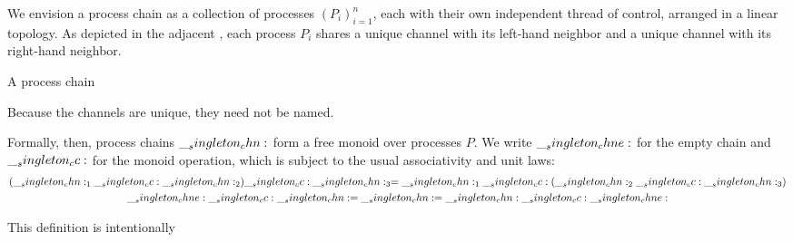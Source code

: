 We envision a process chain as a collection of processes $(P_i)_{i=1}^{n}$, each with their own independent thread of control, arranged in a linear topology.
As depicted in the adjacent , each process $P_i$ shares a unique channel with its left-hand neighbor and a unique channel with its right-hand neighbor.
%
\begin{marginfigure}
  \caption{A process chain}\label{fig:singleton-processes:chain-topology}
\end{marginfigure}
%
Because the channels are unique, they need not be named.

Formally, then, process chains $\__singleton_chn:$ form a free monoid over processes $P$.
We write $\__singleton_chne:$ for the empty chain and $\__singleton_cc:$ for the monoid operation, which is subject to the usual associativity and unit laws:
\begin{gather*}
  (\__singleton_chn:_1 \__singleton_cc: \__singleton_chn:_2) \__singleton_cc: \__singleton_chn:_3 = \__singleton_chn:_1 \__singleton_cc: (\__singleton_chn:_2 \__singleton_cc: \__singleton_chn:_3) \\
  \__singleton_chne: \__singleton_cc: \__singleton_chn: = \__singleton_chn: = \__singleton_chn: \__singleton_cc: \__singleton_chne:
\end{gather*}


This definition is intentionally


